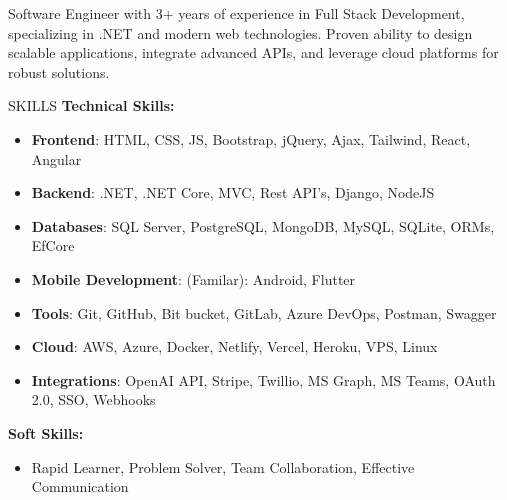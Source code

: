 \documentclass{resume} %
\begin{document}
  


\begin{rSection}%

{Software Engineer with 3+ years of experience in Full Stack Development, specializing in .NET and modern web technologies. Proven ability to design scalable applications, integrate advanced APIs, and leverage cloud platforms for robust solutions. %
}


\end{rSection}


\begin{rSection}{SKILLS}
\textbf{Technical Skills:}
\begin{itemize}
	\item \textbf{Frontend}: HTML, CSS, JS, Bootstrap, jQuery, Ajax, Tailwind, React, Angular
	\item \textbf{Backend}:  .NET, .NET Core, MVC, Rest API's, Django, NodeJS
	\item \textbf{Databases}: SQL Server, PostgreSQL, MongoDB, MySQL, SQLite, ORMs, EfCore
	\item \textbf{Mobile Development}: (Familar): Android, Flutter
	\item \textbf{Tools}: Git, GitHub, Bit bucket, GitLab, Azure DevOps, Postman, Swagger
	\item \textbf{Cloud}: AWS, Azure, Docker, Netlify, Vercel, Heroku, VPS, Linux
	\item \textbf{Integrations}: OpenAI API, Stripe, Twillio, MS Graph, MS Teams, OAuth 2.0, SSO, Webhooks
	
\end{itemize}


\textbf{Soft Skills:} 
\begin{itemize}
\item Rapid Learner, Problem Solver, Team Collaboration, Effective Communication
\end{itemize}


\end{rSection}
\end{document}

